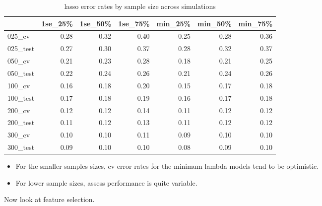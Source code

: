 \documentclass[
]{book}
\begin{document}
\begin{table}

\caption{\label{tab:print-lasso-simRes-errors-overSim}lasso error rates by sample size across simulations}
\centering
\begin{tabular}[t]{l|r|r|r|r|r|r}
\hline
  & 1se\_25\% & 1se\_50\% & 1se\_75\% & min\_25\% & min\_50\% & min\_75\%\\
\hline
025\_cv & 0.28 & 0.32 & 0.40 & 0.25 & 0.28 & 0.36\\
\hline
025\_test & 0.27 & 0.30 & 0.37 & 0.28 & 0.32 & 0.37\\
\hline
050\_cv & 0.21 & 0.23 & 0.28 & 0.18 & 0.21 & 0.25\\
\hline
050\_test & 0.22 & 0.24 & 0.26 & 0.21 & 0.24 & 0.26\\
\hline
100\_cv & 0.16 & 0.18 & 0.20 & 0.15 & 0.17 & 0.18\\
\hline
100\_test & 0.17 & 0.18 & 0.19 & 0.16 & 0.17 & 0.18\\
\hline
200\_cv & 0.12 & 0.12 & 0.14 & 0.11 & 0.12 & 0.12\\
\hline
200\_test & 0.11 & 0.12 & 0.13 & 0.11 & 0.12 & 0.12\\
\hline
300\_cv & 0.10 & 0.10 & 0.11 & 0.09 & 0.10 & 0.10\\
\hline
300\_test & 0.09 & 0.10 & 0.10 & 0.08 & 0.09 & 0.10\\
\hline
\end{tabular}
\end{table}

\begin{itemize}
\item
  For the smaller samples sizes, cv error rates for the minimum lambda models tend to be
  optimistic.
\item
  For lower sample sizes, assess performance is quite variable.
\end{itemize}

Now look at feature selection.
\end{document}
